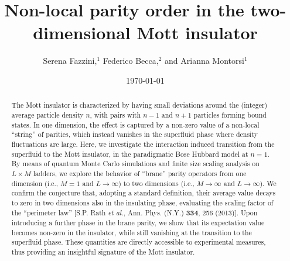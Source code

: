 \documentclass[aps,prb,floatfix,twocolumn,amsmath,amssymb]{revtex4}
\begin{document}
\title{Non-local parity order in the two-dimensional Mott insulator}
\author{Serena Fazzini,$^{1}$ Federico Becca,$^{2}$ and Arianna Montorsi$^{1}$}

\date{\today}

\begin{abstract}
The Mott insulator is characterized by having small deviations around the (integer) average particle density $n$, with pairs 
with $n-1$ and $n+1$ particles forming bound states. In one dimension, the effect is captured by a non-zero value of a non-local 
``string'' of parities, which instead vanishes in the superfluid phase where density fluctuations are large. Here, we investigate 
the interaction induced transition from the superfluid to the Mott insulator, in the paradigmatic Bose Hubbard model at $n=1$. 
By means of quantum Monte Carlo simulations and finite size scaling analysis on $L \times M$ ladders, we explore the behavior 
of ``brane'' parity operators from one dimension (i.e., $M=1$ and $L \to \infty$) to two dimensions (i.e., $M \to \infty$ and 
$L \to \infty$). We confirm the conjecture that, adopting a standard definition, their average value decays to zero in two 
dimensions also in the insulating phase, evaluating the scaling factor of the ``perimeter law'' [S.P. Rath {\it et al.}, 
Ann. Phys. (N.Y.) {\bf 334}, 256 (2013)]. Upon introducing a further phase in the brane parity, we show that its expectation 
value becomes non-zero in the insulator, while still vanishing at the transition to the superfluid phase. These quantities are 
directly accessible to experimental measures, thus providing an insightful signature of the Mott insulator.
\end{abstract}

\maketitle
\end{document}
